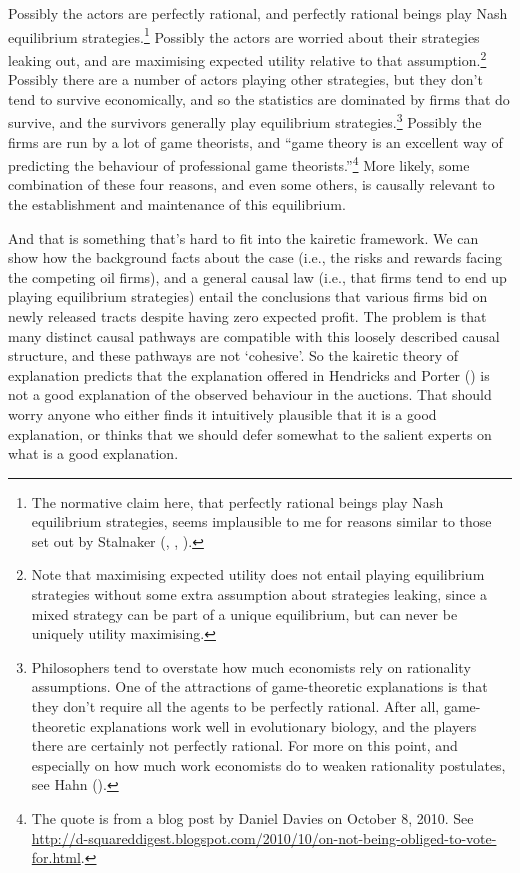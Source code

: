 \documentclass[
  11pt,
  letterpaper,
  DIV=11,
  numbers=noendperiod,
  twoside]{scrartcl}
\begin{document}
Possibly the actors are perfectly rational, and perfectly rational
beings play Nash equilibrium strategies.\footnote{The normative claim
  here, that perfectly rational beings play Nash equilibrium strategies,
  seems implausible to me for reasons similar to those set out by
  Stalnaker (,
  ,
  ).} Possibly the actors are worried
about their strategies leaking out, and are maximising expected utility
relative to that assumption.\footnote{Note that maximising expected
  utility does not entail playing equilibrium strategies without some
  extra assumption about strategies leaking, since a mixed strategy can
  be part of a unique equilibrium, but can never be uniquely utility
  maximising.} Possibly there are a number of actors playing other
strategies, but they don't tend to survive economically, and so the
statistics are dominated by firms that do survive, and the survivors
generally play equilibrium strategies.\footnote{Philosophers tend to
  overstate how much economists rely on rationality assumptions. One of
  the attractions of game-theoretic explanations is that they don't
  require all the agents to be perfectly rational. After all,
  game-theoretic explanations work well in evolutionary biology, and the
  players there are certainly not perfectly rational. For more on this
  point, and especially on how much work economists do to weaken
  rationality postulates, see Hahn ().}
Possibly the firms are run by a lot of game theorists, and ``game theory
is an excellent way of predicting the behaviour of professional game
theorists.''\footnote{The quote is from a blog post by Daniel Davies on
  October 8, 2010. See
  \url{http://d-squareddigest.blogspot.com/2010/10/on-not-being-obliged-to-vote-for.html}.}
More likely, some combination of these four reasons, and even some
others, is causally relevant to the establishment and maintenance of
this equilibrium.

And that is something that's hard to fit into the kairetic framework. We
can show how the background facts about the case (i.e., the risks and
rewards facing the competing oil firms), and a general causal law (i.e.,
that firms tend to end up playing equilibrium strategies) entail the
conclusions that various firms bid on newly released tracts despite
having zero expected profit. The problem is that many distinct causal
pathways are compatible with this loosely described causal structure,
and these pathways are not `cohesive'. So the kairetic theory of
explanation predicts that the explanation offered in Hendricks and
Porter () is not a good
explanation of the observed behaviour in the auctions. That should worry
anyone who either finds it intuitively plausible that it is a good
explanation, or thinks that we should defer somewhat to the salient
experts on what is a good explanation.
\end{document}
